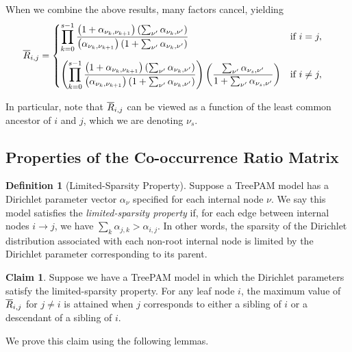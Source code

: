 \documentclass{article}
\theoremstyle{definition}
\newtheorem{claim}[thm]{Claim}
\newtheorem{defn}[thm]{Definition}
\begin{document}
When we combine the above results, many factors cancel, yielding
\begin{align}
\overline{R}_{i,j}
&=
\begin{cases}
\displaystyle
\prod_{k=0}^{s-1}
  \frac{ \left( 1 + \alpha_{\nu_k,\nu_{k+1}} \right) \left( \sum_{\nu'} \alpha_{\nu_k, \nu'} \right) }
       { \left( \alpha_{\nu_k,\nu_{k+1}} \right) \left( 1 + \sum_{\nu'} \alpha_{\nu_k, \nu'} \right) }
&
\text{if } i = j,
\\[4ex]
\displaystyle
\left(
  \prod_{k=0}^{s-1}
    \frac{ \left( 1 + \alpha_{\nu_k,\nu_{k+1}} \right) \left( \sum_{\nu'} \alpha_{\nu_k, \nu'} \right) }
         { \left( \alpha_{\nu_k,\nu_{k+1}} \right) \left( 1 + \sum_{\nu'} \alpha_{\nu_k, \nu'} \right) }
\right)
\left(
  \frac{\sum_{\nu'} \alpha_{\nu_s, \nu'}}
       {1 + \sum_{\nu'} \alpha_{\nu_s, \nu'}}
\right)
&
\text{if } i \neq j,
\end{cases}
\label{eqn:closedFormRbar}
\end{align}

In particular, note that $\overline{R}_{i,j}$ can be viewed as a function of the least common ancestor of $i$ and $j$, which we are denoting $\nu_s$.

\subsection{Properties of the Co-occurrence Ratio Matrix}

\begin{defn}[Limited-Sparsity Property]
Suppose a TreePAM model has a Dirichlet parameter vector $\alpha_\nu$ specified for each internal node $\nu$.
We say this model satisfies the \emph{limited-sparsity property} if, for each edge between internal nodes $i \to j$, we have $\sum_k \alpha_{j,k} > \alpha_{i,j}$.
In other words, the sparsity of the Dirichlet distribution associated with each non-root internal node is limited by the Dirichlet parameter corresponding to its parent.
\end{defn}

\begin{claim}
Suppose we have a TreePAM model in which the Dirichlet parameters satisfy the limited-sparsity property.
For any leaf node $i$, the maximum value of $\overline{R}_{i,j}$ for $j \neq i$ is attained when $j$ corresponds to either a sibling of $i$ or a descendant of a sibling of $i$.
\label{claim:RbarMatrixProperty}
\end{claim}

We prove this claim using the following lemmas.
\end{document}
